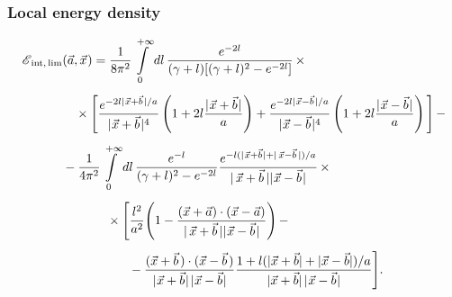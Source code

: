 \documentclass[10pt,t]{beamer}
\begin{document}
\begin{frame}
  \frametitle{Local energy density}

  \vspace{-1em}


  \begin{equation}
    \label{eq:Rescaled-version-of-the-model-08}
    \begin{split}
      \mathcal{E}_{ \, \textrm{int}, \, \textrm{lim} }
      &( \vec{a}, \vec{x} \hspace{0.05em} ) =
        \frac{ 1 }{ 8\pi^{ 2 } }
        \int\limits_{ 0 }^{ +\infty } dl \,
        \frac{ e^{ -2 l } }{ ( \gamma + l ) [ ( \gamma + l )^{ 2 } - e^{ -2 l } ] } \, \times
      \\[0.5em]
      &\hspace{1em}
        \times \Bigg[ \frac{ e^{ -2 l | \hspace{0.05em}  \vec{x} + \vec{b}  \hspace{0.075em} | / a } }{
        | \hspace{0.05em}  \vec{x} + \vec{b}  \hspace{0.075em} |^{ 4 } }
        \left( 1 + 2 l \frac{ | \hspace{0.05em}  \vec{x} + \vec{b}  \hspace{0.075em} | }{ a } \right) +
        \frac{ e^{ -2 l | \hspace{0.05em}  \vec{x} - \vec{b}  \hspace{0.075em} | / a } }{
        | \hspace{0.05em}  \vec{x} - \vec{b}  \hspace{0.075em} |^{ 4 } } \left( 1 +
        2 l \frac{ | \hspace{0.05em}  \vec{x} - \vec{b}  \hspace{0.075em} | }{ a } \right) \Bigg] \, -
      \\[0.5em]
      &- \frac{ 1 }{ 4 \pi^{ 2 } } \int\limits_{ 0 }^{ +\infty } dl \,
        \frac{ e^{ -l } }{ ( \gamma + l )^{ 2 } - e^{ -2 l } }
        \frac{ e^{ -l ( | \hspace{0.05em}  \vec{x} + \vec{b}  \hspace{0.05em} | + |\,
        \vec{x} - \vec{b}\, | ) / a } }{ |\, \vec{x} + \vec{b}\, | | \hspace{0.05em}  \vec{x} -
        \vec{b}  \hspace{0.075em} | } \, \times \\[0.5em]
      &\hspace{3.5em}
        \times \Bigg[ \frac{ l^{ 2 } }{ a^{ 2 } } \Bigg( 1 - \frac{ (
        \vec{x} + \vec{a} ) \cdot ( \vec{x} - \vec{a} ) }{ |\, \vec{x}
        + \vec{b}\, | | \hspace{0.05em}  \vec{x} - \vec{b}  \hspace{0.075em} | } \Bigg) \, - \\[0.5em]
      &\hspace{5.25em}
        - \frac{ ( \vec{x} + \vec{b} \hspace{0.13em} ) \cdot
        ( \vec{x} - \vec{b} \hspace{0.13em} ) }{
        | \hspace{0.05em}  \vec{x} + \vec{b}  \hspace{0.05em} | \hspace{0.11em}
        | \hspace{0.05em}  \vec{x} - \vec{b}  \hspace{0.05em} | }
        \frac{ 1 + l ( | \vec{x}
        + \vec{b} | + | \vec{x} - \vec{b} | ) / a }{ | \vec{x} +
        \vec{b} | \, | \hspace{0.05em}  \vec{x} - \vec{b}  \hspace{0.05em} | } \Bigg].
    \end{split}
  \end{equation}

\end{frame}
\end{document}
